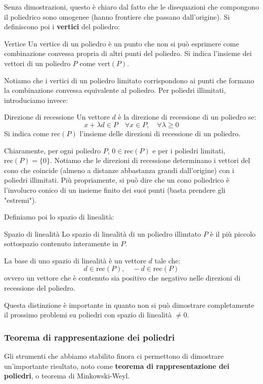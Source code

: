\documentclass[a4paper,11pt]{article}
\begin{document}
Senza dimostrazioni, questo è chiaro dal fatto che le disequazioni che compongono il poliedrico sono omogenee (hanno frontiere che passano dall'origine).
Si definiscono poi i \textbf{vertici} del poliedro:
\begin{definition}{Vertice}
	Un vertice di un poliedro è un punto che non si può esprimere come combinazione convessa propria di altri punti del poliedro.
	Si indica l'insieme dei vettori di un poliedro $P$ come $\mathrm{vert}(P)$.
\end{definition}
Notiamo che i vertici di un poliedro limitato corrispondono ai punti che formano la combinazione convessa equivalente al poliedro.
Per poliedri illimitati, introduciamo invece:
\begin{definition}{Direzione di recessione}
	Un vettore $d$ è la direzione di recessione di un poliedro se:
	$$
	x + \lambda d \in P \quad \forall x \in P, \quad \forall \lambda \geq 0
	$$
	Si indica come $\mathrm{rec}(P)$ l'insieme delle direzioni di recessione di un poliedro.
\end{definition}

Chiaramente, per ogni poliedro $P$, $0 \in \mathrm{rec}(P)$ e per i poliedri limitati, $\mathrm{rec}(P) = \{0\}$.
Notiamo che le direzioni di recessione determinano i vettori del cono che coincide (almeno a distanze abbastanza grandi dall'origine) con i poliedri illimitati.
Più propriamente, si può dire che un cono poliedrico è l'involucro conico di un insieme finito dei suoi punti (basta prendere gli "estremi").

Definiamo poi lo spazio di linealità:
\begin{definition}{Spazio di linealità}
	Lo spazio di linealità di un poliedro illimtato $P$ è il più piccolo sottospazio contenuto interamente in $P$.
\end{definition}
La base di uno spazio di linealità è un vettore $d$ tale che:
$$
d \in \mathrm{rec}(P), \quad - d \in \mathrm{rec}(P)
$$
ovvero un vettore che è contenuto sia positivo che negativo nelle direzioni di recessione del poliedro.

Questa distinzione è importante in quanto non si può dimostrare completamente il prossimo problemi su poliedri con spazio di linealità $\neq {0}$.

\subsubsection{Teorema di rappresentazione dei poliedri}
Gli strumenti che abbiamo stabilito finora ci permettono di dimostrare un'importante risultato, noto come \textbf{teorema di rappresentazione dei poliedri}, o teorema di Minkowski-Weyl.
\end{document}
